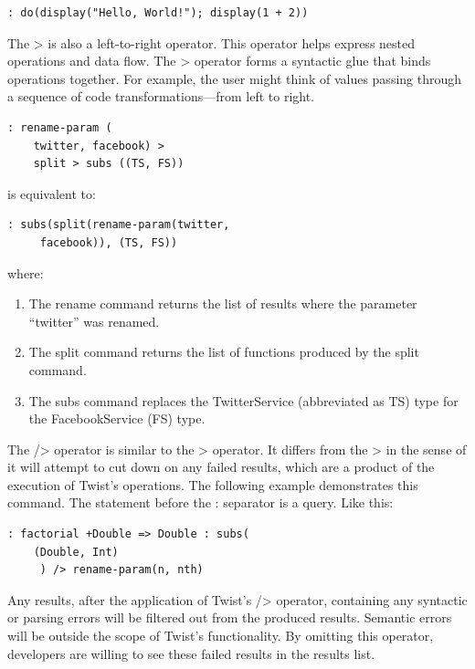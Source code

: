 \begin{verbatim}
: do(display("Hello, World!"); display(1 + 2))
\end{verbatim}

The > is also a left-to-right operator. This operator helps express nested operations and data flow.  The > operator forms a syntactic glue that binds operations together. For example, the user might think of values passing through a sequence of code transformations---from left to right.

\begin{verbatim}
: rename-param (
	twitter, facebook) > 
	split > subs ((TS, FS))
\end{verbatim}

is equivalent to:

\begin{verbatim}
: subs(split(rename-param(twitter, 
	 facebook)), (TS, FS))
\end{verbatim}

where:

\begin{enumerate}
	\item The rename command returns the list of results where the parameter ``twitter'' was 
	renamed.
	\item The split command returns the list of functions produced by the split command.
	\item The subs command replaces the TwitterService (abbreviated as TS) type for the 
	FacebookService (FS) type.
\end{enumerate}

The /> operator is similar to the > operator. It differs from the > in the sense of it will attempt to cut down on any failed results, which are a product of the execution of Twist's operations. The following example demonstrates this command. The statement before the : separator is a query. Like this:

\begin{verbatim}
: factorial +Double => Double : subs(
	(Double, Int)
	 ) /> rename-param(n, nth) 
\end{verbatim}

Any results, after the application of Twist's /> operator, containing any syntactic or parsing errors will be filtered out from the produced results. Semantic errors will be outside the scope of Twist's functionality. By omitting this operator, developers are willing to see these failed results in the results list.

